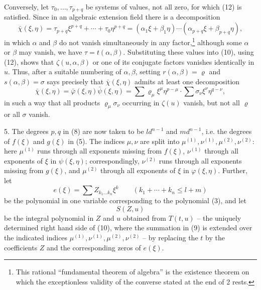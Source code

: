 Conversely, let $\tau_0,\ldots,\tau_{p+q}$ be systems of values, not all zero, for which (12) is satisfied. Since in an algebraic extension field there is a decomposition
\begin{equation}
 \bar\chi(\xi,\eta)=\tau_{p+q}\xi^{p+q}+\cdots+\tau_0\eta^{p+q}
=(\alpha_1\xi+\beta_1\eta)\cdots(\alpha_{p+q}\xi+\beta_{p+q}\eta),
\tag{12'}
\end{equation}
in which $\alpha$ and $\beta$ do not vanish simultaneously in any factor,\footnote{This rational ``fundamental theorem of algebra'' is the existence theorem on which the exceptionless validity of the converse stated at the end of 2 rests.} although some $\alpha$ or $\beta$ may vanish, we have $\tau=t(\alpha,\beta)$. Substituting these values into (10), using (12), shows that $\zeta(u,\alpha,\beta)$ or one of its conjugate factors vanishes identically in $u$. Thus, after a suitable numbering of $\alpha,\beta$, setting $r(\alpha,\beta)=\varrho$ and $s(\alpha,\beta)=\sigma$ says precisely that $\bar\chi(\xi,\eta)$ admits at least one decomposition
\begin{equation}
\bar\chi(\xi,\eta)=\bar\varphi(\xi,\eta)\bar\psi(\xi,\eta)
=\sum \varrho_\mu\xi^\mu\eta^{p-\mu}\cdot\sum \sigma_\nu\xi^\nu\eta^{q-\nu},
\tag{13}
\end{equation}
in such a way that all products $\varrho_\mu\sigma_\nu$ occurring in $\zeta(u)$ vanish, but not all $\varrho$ or all $\sigma$ vanish.

5. The degrees $p,q$ in (8) are now taken to be $ld^{n-1}$ and $md^{n-1}$, i.e. the degrees of $f(\xi)$ and $g(\xi)$ in (5). The indices $\mu,\nu$ are split into $\mu^{(1)},\nu^{(1)},\mu^{(2)},\nu^{(2)}$: here $\mu^{(1)}$ runs through all exponents missing from $f(\xi)$, $\nu^{(1)}$ through all exponents of $\xi$ in $\psi(\xi,\eta)$; correspondingly, $\nu^{(2)}$ runs through all exponents missing from $g(\xi)$, and $\mu^{(2)}$ through all exponents of $\xi$ in $\varphi(\xi,\eta)$. Further, let
\[
 e(\xi)=\sum Z_{k_1\ldots k_n}\xi^k\qquad(k_1+\cdots+k_n\le l+m)
\]
be the polynomial in one variable corresponding to the polynomial (3), and let
\[
 S(Z,u)
\]
be the integral polynomial in $Z$ and $u$ obtained from $T(t,u)$ -- the uniquely determined right hand side of (10), where the summation in (9) is extended over the indicated indices $\mu^{(1)},\nu^{(1)},\mu^{(2)},\nu^{(2)}$ -- by replacing the $t$ by the coefficients $Z$ and the corresponding zeros of $e(\xi)$.

